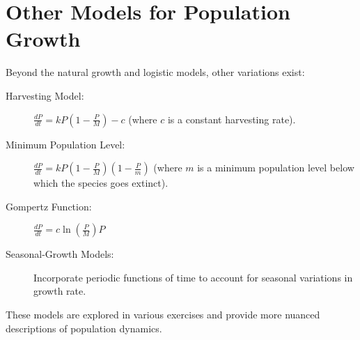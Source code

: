 \documentclass{article}
\begin{document}
\section*{Other Models for Population Growth}
Beyond the natural growth and logistic models, other variations exist:
\begin{description}
    \item[Harvesting Model:] $\frac{dP}{dt} = kP\left(1 - \frac{P}{M}\right) - c$ (where $c$ is a constant harvesting rate).
    \item[Minimum Population Level:] $\frac{dP}{dt} = kP\left(1 - \frac{P}{M}\right)\left(1 - \frac{P}{m}\right)$ (where $m$ is a minimum population level below which the species goes extinct).
    \item[Gompertz Function:] $\frac{dP}{dt} = c \ln\left(\frac{P}{M}\right) P$
    \item[Seasonal-Growth Models:] Incorporate periodic functions of time to account for seasonal variations in growth rate.
\end{description}
These models are explored in various exercises and provide more nuanced descriptions of population dynamics.
\end{document}
